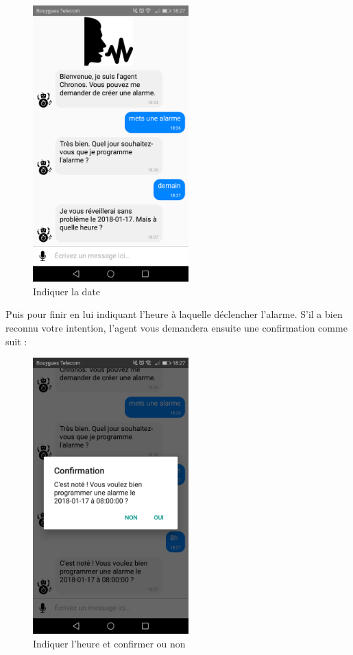 \begin{figure}[H]
  \centering
  \includegraphics[width=6cm]{images/D.png}
  \caption{Indiquer la date}
\end{figure}

Puis pour finir en lui indiquant l'heure à laquelle déclencher l'alarme. S'il a bien reconnu votre intention, l'agent vous demandera ensuite une confirmation comme suit :

\begin{figure}[H]
  \centering
  \includegraphics[width=6cm]{images/E.png}
  \caption{Indiquer l'heure et confirmer ou non}
\end{figure}

